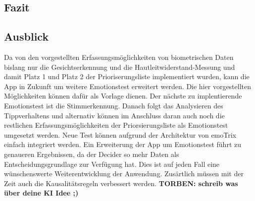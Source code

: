 \subsection{Fazit}

\subsection{Ausblick}
Da von den vorgestellten Erfassungsmöglichkeiten von biometrischen Daten bislang nur die Gesichtserkennung und die Hautleitwiderstand-Messung und damit Platz 1 und Platz 2 der Prioriserungsliste implementiert wurden, kann die App in Zukunft um weitere Emotionstest erweitert werden. Die hier vorgestellten Möglichkeiten können dafür als Vorlage dienen. Der nächste zu implentierende Emotionstest ist die Stimmerkennung. Danach folgt das Analysieren des Tippverhaltens und alternativ können im Anschluss daran auch noch die restlichen Erfassungsmöglichkeiten der Priorsierungsliste als Emotionstest umgesetzt werden. Neue Test können aufgrund der Architektur von emoTrix einfach integriert werden. \newline
Ein Erweiterung der App um Emotionstest führt zu genaueren Ergebnissen, da der Decider so mehr Daten als Entscheidungsgrundlage zur Verfügung hat. Dies ist auf jeden Fall eine wünschenswerte Weiterentwicklung der Anwendung.\newline
Zusärtlich müssen mit der Zeit auch die Kausalitätsregeln verbessert werden. \textbf{TORBEN: schreib was über deine KI Idee ;)} 
